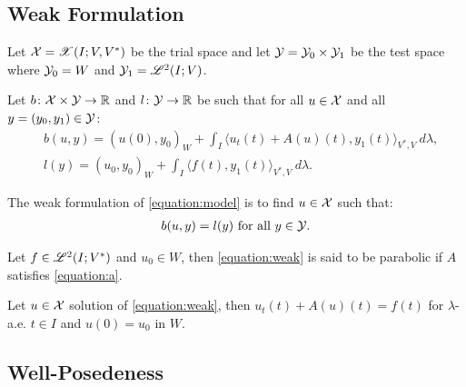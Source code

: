 \newpage
\subsection{Weak Formulation}

\begin{definition}
    Let $\mathcal{X} = \mathscr{X}(I; V, V^*)$ be the trial space and let $\mathcal{Y} = \mathcal{Y}_0 \times \mathcal{Y}_1$ be the test space where $\mathcal{Y}_0 = W$ and $\mathcal{Y}_1 = \mathscr{L}^{2}(I; V)$.
\end{definition}

\begin{definition}[$b$ and $l$]
    Let $b \colon \mathcal{X} \times \mathcal{Y} \rightarrow \mathbb{R}$ and $l \colon \mathcal{Y} \rightarrow \mathbb{R}$ be such that for all $u \in \mathcal{X}$ and all $y = (y_0, y_1) \in \mathcal{Y}$:
    \begin{align}
        & b(u, y) = \left( u(0), y_0 \right)_W + \int_I \langle u_t(t) + A(u)(t), y_1(t) \rangle_{V^*, V} ~ d \lambda, \\
        & l(y) = \left( u_0, y_0 \right)_W + \int_I \langle f(t), y_1(t) \rangle_{V^*, V} ~ d \lambda.
    \end{align}
\end{definition}

\begin{definition}
    The weak formulation of \ref{equation:model} is to find $u \in \mathcal{X}$ such that:
    \begin{gather}
        b(u, y) = l(y) \text{ for all } y \in \mathcal{Y}. \label{equation:weak}
    \end{gather}
\end{definition}

\begin{definition}
    Let $f \in \mathscr{L}^{2}(I; V^*)$ and $u_0 \in W$, then \eqref{equation:weak} is said to be parabolic if $A$ satisfies \eqref{equation:a}.
\end{definition}

\begin{lemma}
    Let $u \in \mathcal{X}$ solution of \eqref{equation:weak}, then $u_t(t) + A(u)(t) = f(t)$ for $\lambda$-a.e. $t \in I$ and $u(0) = u_0$ in $W$.
\end{lemma}

\newpage
\subsection{Well-Posedeness}


